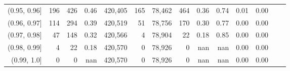 \begin{tabular}{rrrrrrrrrrrrrr}
(0.95, 0.96]   &    196 &    426 &    0.46 &  420,405 &      165 &  78,462 &     464 &  0.36 &  0.74 &  0.01 &      0.00 \\
(0.96, 0.97]   &    114 &    294 &    0.39 &  420,519 &       51 &  78,756 &     170 &  0.30 &  0.77 &  0.00 &      0.00 \\
(0.97, 0.98]   &     47 &    148 &    0.32 &  420,566 &        4 &  78,904 &      22 &  0.18 &  0.85 &  0.00 &      0.00 \\
(0.98, 0.99]   &      4 &     22 &    0.18 &  420,570 &        0 &  78,926 &       0 &   nan &   nan &  0.00 &      0.00 \\
(0.99, 1.0]    &      0 &      0 &     nan &  420,570 &        0 &  78,926 &       0 &   nan &   nan &  0.00 &      0.00 \\
\bottomrule
\end{tabular}
